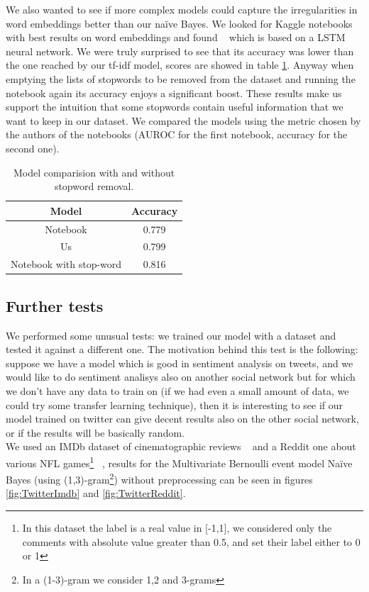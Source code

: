 We also wanted to see if more complex models could capture the irregularities in word embeddings better than our na\"ive Bayes. 
We looked for Kaggle notebooks with best results on word embeddings and found ~\cite{startups:notebook2} which is based on a LSTM neural network.
We were truly surprised to see that its accuracy was lower than the one reached by our tf-idf model, scores are showed in table \ref{tab:versus_metrics_FT}. 
Anyway when emptying the lists of stopwords to be removed from the dataset and running the notebook again its accuracy enjoys a significant boost. 
These results make us support the intuition that some stopwords contain useful information that we want to keep in our dataset. We compared the models using the metric chosen by the authors of the notebooks (AUROC for the first notebook, accuracy for the second one).

\begin{table}[h!t]
    \centering
    \caption{Model comparision with and without stopword removal.}
    \label{tab:versus_metrics_FT}
    \begin{tabular}{c|c}
        \hline
        Model & Accuracy\\
        \hline 
        Notebook & 0.779 \\ 
        Us & 0.799 \\ 
        Notebook with stop-word & 0.816 \\ 
        \hline
    \end{tabular}
\end{table}

\subsection*{Further tests}
We performed some unusual tests: we trained our model with a dataset and tested it against a different one. The motivation behind this test is the following: suppose we have a model which is good in sentiment analysis on tweets, and we would like to do sentiment analisys also on another social network but for which we don't have any data to train on (if we had even a small amount of data, we could try some transfer learning technique), then it is interesting to see if our model trained on twitter can give decent results also on the other social network, or if the results will be basically random.\\
We used an IMDb dataset of cinematographic reviews ~\cite{data:imdb} and a Reddit one about various NFL games\footnote{In this dataset the label is a real value in [-1,1], we considered only the comments with absolute value greater than 0.5, and set their label either to 0 or 1} ~\cite{data:reddit}, results for the Multivariate Bernoulli event model Na\"ive Bayes (using (1,3)-gram\footnote{In a (1-3)-gram we consider 1,2 and 3-grams}) without preprocessing can be seen in figures \ref{fig:TwitterImdb} and \ref{fig:TwitterReddit}.

